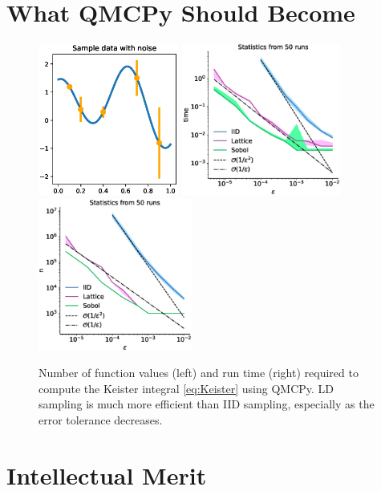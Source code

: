\documentclass[11pt]{NSFamsart}
\begin{document}
\fi



\section{What QMCPy Should Become}


\begin{figure}
	\centering
	\includegraphics[height = 5cm]{ProgramsImages/sample_data.eps} \quad
	\includegraphics[height = 5cm]{ProgramsImages/qEI_cost_comp_time.eps} \quad
	\includegraphics[height = 5cm]{ProgramsImages/qEI_cost_comp_n.eps} 
	\caption{Number of function values (left) and run time (right) required to compute the Keister integral \eqref{eq:Keister} using QMCPy.  LD sampling is much more efficient than IID sampling, especially as the error tolerance decreases.}
	\label{fig:qei}
\end{figure}


\section{Intellectual Merit}
\end{document}
